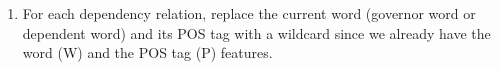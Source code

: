 \documentclass[11pt,a4paper]{article}
\theoremstyle{definition}
\begin{document}
\begin{enumerate}
    \item For each dependency relation, replace the current word (governor word or dependent word) and its POS tag with a wildcard since we already have the word (W) and the POS tag (P) features.
    
    

\end{enumerate}
\end{document}
